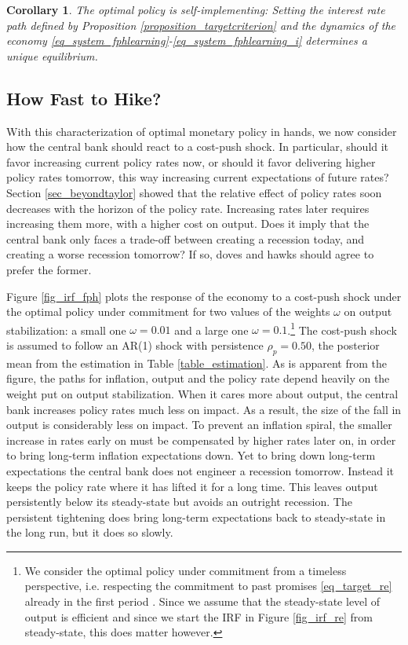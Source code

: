 \documentclass{article}
\newtheorem{corollary}{Corollary}
\begin{document}
\begin{corollary}
	The optimal policy is self-implementing: Setting the interest rate path defined by Proposition \ref{proposition_targetcriterion} and the dynamics of the economy \eqref{eq_system_fphlearning}-\eqref{eq_system_fphlearning_i} determines a unique equilibrium.
\end{corollary}

\subsection{How Fast to Hike?}

With this characterization of optimal monetary policy in hands, we now consider how the central bank should react to a cost-push shock. In particular, should it favor increasing current policy rates now, or should it favor delivering higher policy rates tomorrow, this way increasing current expectations of future rates? Section \ref{sec_beyondtaylor} showed that the relative effect of policy rates soon decreases with the horizon of the policy rate. Increasing rates later requires increasing them more, with a higher cost on output. Does it imply that the central bank only faces a trade-off between creating a recession today, and creating a worse recession tomorrow? If so, doves and hawks should agree to prefer the former.

Figure \ref{fig_irf_fph} plots the response of the economy to a cost-push shock under the optimal policy under commitment for two values of the weights $\omega$ on output stabilization: a small one $\omega =0.01$ and a large one $\omega=0.1$.\footnote{We consider the optimal policy under commitment from a timeless perspective, i.e. respecting the commitment to past promises \eqref{eq_target_re} already in the first period \citep[see][chapter 7]{Woodford}. Since we assume that the steady-state level of output is efficient and since we start the IRF in Figure \ref{fig_irf_re} from steady-state, this does matter however.} The cost-push shock is assumed to follow an AR(1) shock with persistence $\rho_p=0.50$, the posterior mean from the estimation in Table \ref{table_estimation}. As is apparent from the figure, the paths for inflation, output and the policy rate depend heavily on the weight put on output stabilization. When it cares more about output, the central bank increases policy rates much less on impact. As a result, the size of the fall in output is considerably less on impact. To prevent an inflation spiral, the smaller increase in rates early on must be compensated by higher rates later on, in order to bring long-term inflation expectations down. Yet to bring down long-term expectations the central bank does not engineer a recession tomorrow. Instead it keeps the policy rate where it has lifted it for a long time. This leaves output persistently below its steady-state but avoids an outright recession. The persistent tightening does bring long-term expectations back to steady-state in the long run, but it does so slowly.
\end{document}
